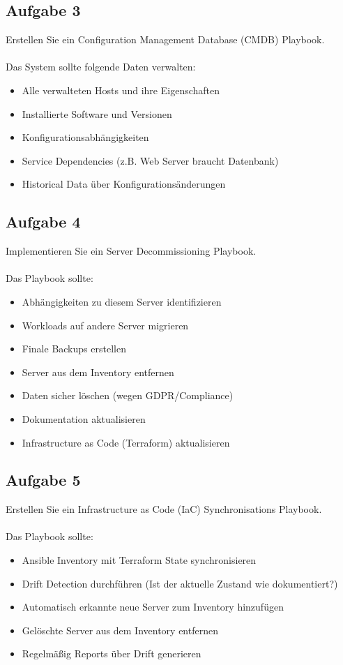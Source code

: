 \documentclass{article}
\begin{document}
    \subsection{Aufgabe 3}
    Erstellen Sie ein Configuration Management Database (CMDB) Playbook.
    \\ \\
    Das System sollte folgende Daten verwalten:
    \begin{itemize}
        \item Alle verwalteten Hosts und ihre Eigenschaften
        \item Installierte Software und Versionen
        \item Konfigurationsabhängigkeiten
        \item Service Dependencies (z.B. Web Server braucht Datenbank)
        \item Historical Data über Konfigurationsänderungen
    \end{itemize}

    \subsection{Aufgabe 4}
    Implementieren Sie ein Server Decommissioning Playbook.
    \\ \\
    Das Playbook sollte:
    \begin{itemize}
        \item Abhängigkeiten zu diesem Server identifizieren
        \item Workloads auf andere Server migrieren
        \item Finale Backups erstellen
        \item Server aus dem Inventory entfernen
        \item Daten sicher löschen (wegen GDPR/Compliance)
        \item Dokumentation aktualisieren
        \item Infrastructure as Code (Terraform) aktualisieren
    \end{itemize}

    \subsection{Aufgabe 5}
    Erstellen Sie ein Infrastructure as Code (IaC) Synchronisations Playbook.
    \\ \\
    Das Playbook sollte:
    \begin{itemize}
        \item Ansible Inventory mit Terraform State synchronisieren
        \item Drift Detection durchführen (Ist der aktuelle Zustand wie dokumentiert?)
        \item Automatisch erkannte neue Server zum Inventory hinzufügen
        \item Gelöschte Server aus dem Inventory entfernen
        \item Regelmäßig Reports über Drift generieren
    \end{itemize}
\end{document}
